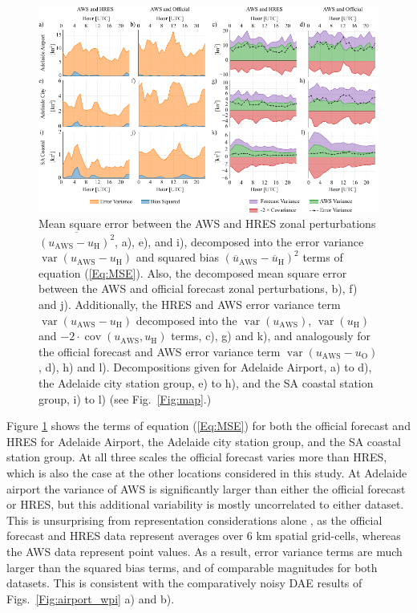 \documentclass{ametsoc}
\DeclareMathOperator{\cov}{cov}
\DeclareMathOperator{\var}{var}
\begin{document}
\begin{figure}
\centering
\includegraphics[width=39pc]{error_decomp_sa.pdf}
\caption{Mean square error between the AWS and HRES zonal perturbations $\overline{\left(u_\text{AWS} - u_\text{H}\right)^2}$, a), e), and i), decomposed into the error variance $\var\left(u_\text{AWS} - u_\text{H}\right)$ and squared bias $\left(\overline{u}_\text{AWS} - \overline{u}_\text{H}\right)^2$ terms of equation (\ref{Eq:MSE}). Also, the decomposed mean square error between the AWS and official forecast zonal perturbations, b), f) and j). Additionally, the HRES and AWS error variance term $\var\left(u_\text{AWS} - u_\text{H}\right)$ decomposed into the $\var\left(u_\text{AWS}\right)$, $\var\left(u_\text{H}\right)$ and  $- 2 \cdot \cov\left(u_\text{AWS}, u_\text{H}\right)$ terms, c), g) and k), and analogously for the official forecast and AWS error variance term $\var\left(u_\text{AWS} - u_\text{O}\right)$, d), h) and l). Decompositions given for Adelaide Airport, a) to d), the Adelaide city station group, e) to h), and the SA coastal station group, i) to l) (see Fig.~\ref{Fig:map}.)}
\label{Fig:error_decomp_sa}
\end{figure}

Figure \ref{Fig:error_decomp_sa} shows the terms of equation (\ref{Eq:MSE}) for both the official forecast and HRES for Adelaide Airport, the Adelaide city station group, and the SA coastal station group.  At all three scales the official forecast varies more than HRES, which is also the case at the other locations considered in this study. At Adelaide airport the variance of AWS is significantly larger than either the official forecast or HRES, but this additional variability is mostly uncorrelated to either dataset. This is unsurprising from representation considerations alone \citep[e.g.][]{zaron06}, as the official forecast and HRES data represent averages over 6 km spatial grid-cells, whereas the AWS data represent point values. As a result, error variance terms are much larger than the squared bias terms, and of comparable magnitudes for both datasets. This is consistent with the comparatively noisy DAE results of Figs.~\ref{Fig:airport_wpi} a) and b). 
\end{document}
